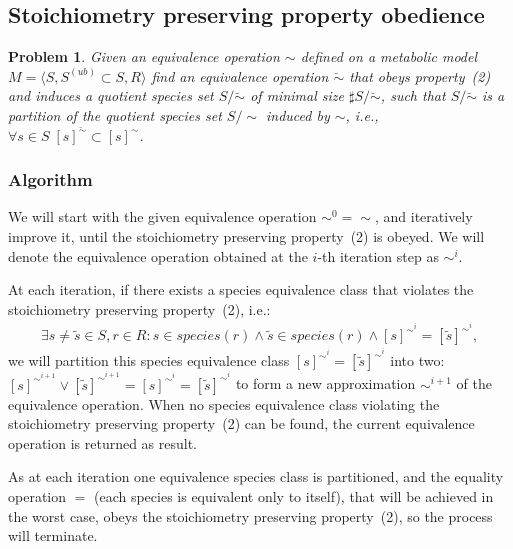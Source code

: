 \documentclass[10pt]{bmc_article}
\newenvironment{bmcformat}{\baselineskip20pt\sloppy\setboolean{publ}{false}}{\baselineskip20pt\sloppy}
\begin{document}
\begin{bmcformat}
\subsection*{Stoichiometry preserving property obedience}
\newtheorem{p2}[pbm]{Problem}
\begin{p2}
Given an equivalence operation $\sim$ defined on a metabolic model $M=\langle S, S^{(ub)}\subset{S}, R \rangle$ find an equivalence operation $\breve{\sim}$ that obeys property~(2) and induces a quotient species set $S/\breve{\sim}$ of minimal size $\sharp S/\breve{\sim}$, such that $S/\breve{\sim}$ is a partition of the quotient species set $S/\sim$ induced by $\sim$, i.e., $\forall s \in S \; [s]^{\breve{\sim}} \subset [s]^{\sim} $. 
\end{p2}
\subsubsection*{Algorithm}
We will start with the given equivalence operation $\sim^0 = \sim$, and iteratively improve it, until the stoichiometry preserving property~(2) is obeyed. We will denote the equivalence operation obtained at the $i$-th iteration step as $\sim^i$.

At each iteration, if there exists a species equivalence class that violates the stoichiometry preserving property~(2), i.e.:
\[ \begin{array}{l}
\mbox{$\exists s \neq \tilde{s} \in S, r \in R: s \in species(r) \land \tilde{s} \in species(r) \land  [s]^{{\sim}^i} = [\tilde{s}]^{{\sim}^i}$}, 
\end{array} \]
we will partition this species equivalence class $[s]^{{\sim}^i} = [\tilde{s}]^{{\sim}^i}$ into two: $[s]^{{\sim}^{i+1}}  \vee [\tilde{s}]^{{\sim}^{i+1}}  = [s]^{{\sim}^i} = [\tilde{s}]^{{\sim}^i} $ to form a new approximation ${\sim}^{i+1}$ of the equivalence operation. When no species equivalence class violating the stoichiometry preserving property~(2) can be found, the current equivalence operation is returned as result.

As at each iteration one equivalence species class is partitioned, and the equality operation $=$ (each species is equivalent only to itself), that will be achieved in the worst case, obeys the stoichiometry preserving property~(2), so the process will terminate. \\



\end{bmcformat}
\end{document}

